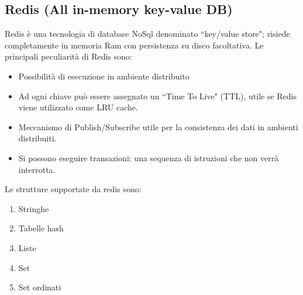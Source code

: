 \subsection{Redis (All in-memory key-value DB)}
Redis è una tecnologia di database NoSql denominato ``key/value store"; risiede completamente in memoria Ram con persistenza su disco facoltativa. Le principali peculiarità di Redis sono:
\begin{itemize}
	\item Possibilità di esecuzione in ambiente distribuito
	\item Ad ogni chiave può essere assegnato un ``Time To Live" (TTL), utile se Redis viene utilizzato come LRU cache.
	\item Meccanismo di Publish/Subscribe utile per la consistenza dei dati in ambienti distribuiti.
	\item Si possono eseguire transazioni: una sequenza di istruzioni che non verrà interrotta.
	
\end{itemize}
Le strutture supportate da redis sono:
\begin{enumerate}
	\item Stringhe
	\item Tabelle hash
	\item Liste
	\item Set
	\item Set ordinati
\end{enumerate}

